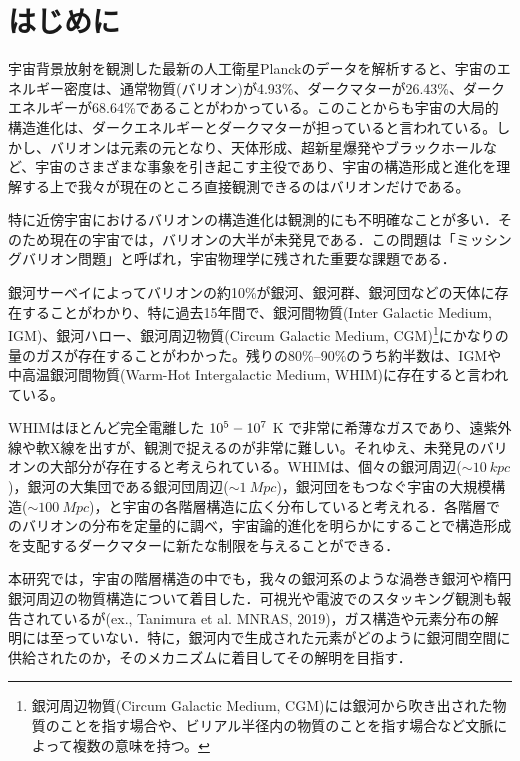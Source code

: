 \chapter{はじめに}

宇宙背景放射を観測した最新の人工衛星Planckのデータを解析すると、宇宙のエネルギー密度は、通常物質(バリオン)が4.93\%、ダークマターが26.43\%、ダークエネルギーが68.64\%であることがわかっている\citep{aghanim_planck_2020}。このことからも宇宙の大局的構造進化は、ダークエネルギーとダークマターが担っていると言われている。しかし、バリオンは元素の元となり、天体形成、超新星爆発やブラックホールなど、宇宙のさまざまな事象を引き起こす主役であり、宇宙の構造形成と進化を理解する上で我々が現在のところ直接観測できるのはバリオンだけである。

特に近傍宇宙におけるバリオンの構造進化は観測的にも不明確なことが多い．そのため現在の宇宙では，バリオンの大半が未発見である\citep{shull_baryon_2012}．この問題は「ミッシングバリオン問題」と呼ばれ，宇宙物理学に残された重要な課題である．

銀河サーベイによってバリオンの約10\%が銀河、銀河群、銀河団などの天体に存在することがわかり、特に過去15年間で、銀河間物質(Inter Galactic Medium, IGM)、銀河ハロー、銀河周辺物質(Circum Galactic Medium, CGM)\footnote{銀河周辺物質(Circum Galactic Medium, CGM)には銀河から吹き出された物質のことを指す場合や、ビリアル半径内の物質のことを指す場合など文脈によって複数の意味を持つ。}にかなりの量のガスが存在することがわかった。残りの80\%--90\%のうち約半数は、IGMや中高温銀河間物質(Warm-Hot Intergalactic Medium, WHIM)に存在すると言われている\citep{shull_baryon_2012,danforth_low-z_2008}。

WHIMはほとんど完全電離した $10^5\--10^7$ K で非常に希薄なガスであり、遠紫外線や軟X線を出すが、観測で捉えるのが非常に難しい。それゆえ、未発見のバリオンの大部分が存在すると考えられている。WHIMは、個々の銀河周辺($\sim\SI{10}{kpc}$)，銀河の大集団である銀河団周辺($\sim\SI{1}{Mpc}$)，銀河団をもつなぐ宇宙の大規模構造($\sim\SI{100}{Mpc}$)，と宇宙の各階層構造に広く分布していると考えれる．各階層でのバリオンの分布を定量的に調べ，宇宙論的進化を明らかにすることで構造形成を支配するダークマターに新たな制限を与えることができる．

本研究では，宇宙の階層構造の中でも，我々の銀河系のような渦巻き銀河や楕円銀河周辺の物質構造について着目した．可視光や電波でのスタッキング観測も報告されているが(ex., Tanimura et al. MNRAS, 2019)，ガス構造や元素分布の解明には至っていない．特に，銀河内で生成された元素がどのように銀河間空間に供給されたのか，そのメカニズムに着目してその解明を目指す．